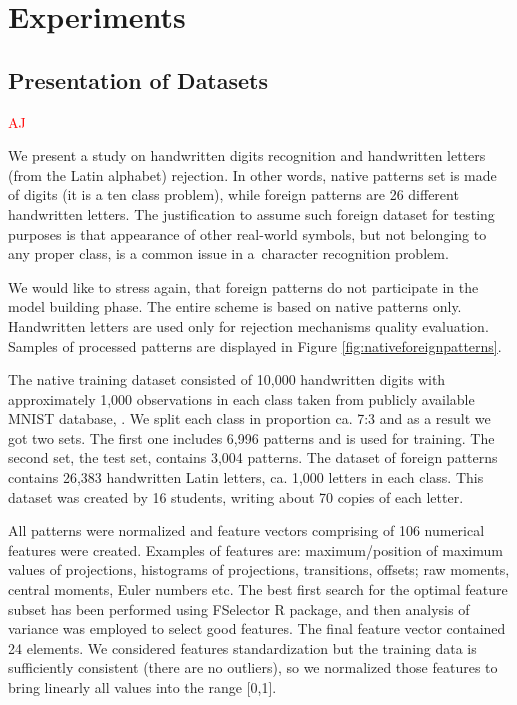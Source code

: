 \documentclass{llncs}
\begin{document}
\section{Experiments}
  \label{sec:Experiments}

\subsection{Presentation of Datasets}
\textcolor{red} {AJ}
\vspace{-3pt}

We present a study on handwritten digits recognition and handwritten letters (from the Latin alphabet) rejection. In other words, native patterns set is made of digits (it is a ten class problem), while foreign patterns are 26 different handwritten letters. The justification to assume such foreign dataset for testing purposes is that appearance of other real-world symbols, but not belonging to any proper class, is a common issue in a~character recognition problem. 

We would like to stress again, that foreign patterns do not participate in the model building phase. The entire scheme is based on native patterns only. Handwritten letters are used only for rejection mechanisms quality evaluation. Samples of processed patterns are displayed in Figure \ref{fig:nativeforeignpatterns}.

The native training dataset consisted of 10,000 handwritten digits with approximately 1,000 observations in each class taken from publicly available MNIST database, \cite{LeCunCortesBurges}. We split each class in proportion ca. 7:3 and as a result we got two sets. The first one includes 6,996 patterns and is used for training. The second set, the test set, contains 3,004 patterns. The dataset of foreign patterns contains 26,383 handwritten Latin letters, ca. 1,000 letters in each class. This dataset was created by 16 students, writing about 70 copies of each letter.

All patterns were normalized and feature vectors comprising of 106 numerical features were created. Examples of features are: maximum/position of maximum values of projections, histograms of projections, transitions, offsets; raw moments, central moments, Euler numbers etc.  The best first search for the optimal feature subset has been performed using FSelector R package, \cite{Romanski} and then analysis of variance was employed to select good features. The final feature vector contained 24 elements. We considered features standardization but the training data is sufficiently consistent (there are no outliers), so we normalized those features to bring linearly all values into the range [0,1]. 
\end{document}
